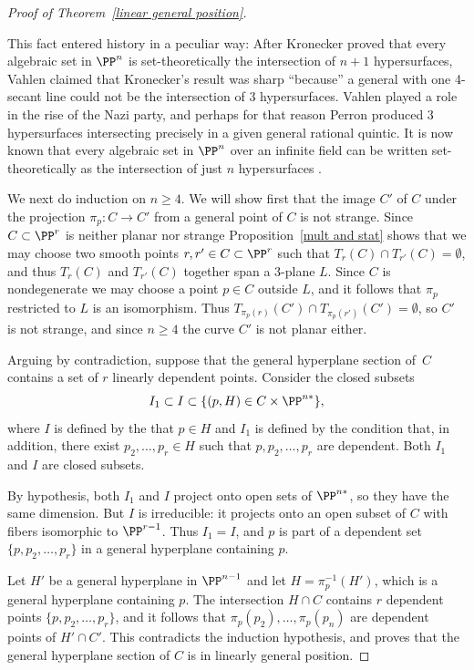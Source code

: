 \begin{proof}[Proof of Theorem~\ref{linear general position}]
\begin{fact}
 This fact entered history in a peculiar way:
 After Kronecker \citeyear{Kronecker} proved that every algebraic set in
  $\PP^{n}$ is set-theoretically the intersection of $n+1$
%
%
%
%
  hypersurfaces, 
Vahlen \citeyear{Vahlen} claimed that Kronecker's result was
  sharp ``because'' a general 
%
with one 4-secant line
  could not be the intersection of 3 hypersurfaces.
  Vahlen played a role in the rise of the Nazi party, and perhaps for
  that reason 
Perron \citeyear{Perron} produced 3 hypersurfaces intersecting
%
  precisely in a given general rational quintic. It is now known that
  every algebraic set in
  $\PP^{n}$ over an infinite field can be written set-theoretically as
  the intersection of just $n$ hypersurfaces \cite{Eisenbud-Evans}.
\end{fact}

We next do induction on $n\geq 4$. We will show first that the image
$C'$ of
$C$ under the projection $\pi_p: C\to C'$ from a general point of $C$
is not strange. Since $C\subset \PP^r$ is neither
planar nor strange
Proposition~\ref{mult and stat} shows that we may choose two smooth points
$r,r'\in C\subset \PP^r$ such that $T_r(C)\cap T_{r'}(C) = \emptyset$,
and thus
$T_r(C)$ and $T_{r'}(C)$ together span a 3-plane $L$. Since $C$ is
nondegenerate we may
choose a point $p\in C$ outside $L$, and it follows that $\pi_p$
restricted to $L$ is an isomorphism.
Thus $T_{\pi_p(r)}(C') \cap T_{\pi_p({r'})}(C') = \emptyset$, so $C'$
is not strange,
and since $n\geq 4$ the curve $C'$ is not planar either.

Arguing by contradiction, suppose that the general hyperplane section
of~$C$ contains a set of $r$ linearly dependent points. Consider the
closed subsets
$$
I_1 \subset I \subset \{(p,H) \in C \times \PP^{n*}\}
,
$$
where $I$ is defined by the 
that $p\in H$ and $I_1$ is defined
by the condition that, in addition, there exist $p_2,\dots, p_r\in H$
such that $p, p_2, \dots, p_r$ are dependent. Both $I_1$ and $I$ are
closed subsets.

By hypothesis, both $I_1$ and $I$ project onto open sets of $\PP^{n*}$,
so they have the same dimension.
But $I$ is irreducible: it projects onto an open subset of $C$ with
fibers isomorphic to $\PP^{r-1}$. Thus $I_1 = I$,
and  $p$ is part of a dependent set
$\{p, p_2,\dots, p_r\}$ in a general hyperplane containing $p$.

Let $H'$ be a general hyperplane in $\PP^{n-1}$
and let $H = \pi_p^{-1}(H')$, which is a general hyperplane containing
$p$. The intersection $H\cap C$
contains $r$ dependent points $\{p, p_2,\dots, p_r\}$, and it follows
that $\pi_p(p_2),\dots,\pi_p(p_n)$
are dependent points of $H'\cap C'$. This contradicts the induction
hypothesis, and proves that
the general hyperplane section of $C$ is in linearly general position.
\end{proof}

